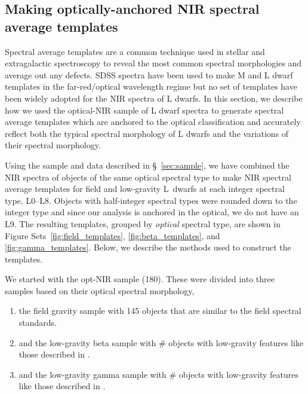 \documentclass[12pt,preprint]{aastex}
\begin{document}
\clearpage
\subsection{Making optically-anchored NIR spectral average templates}
\label{sec:templates}

Spectral average templates are a common technique used in stellar and extragalactic spectroscopy to reveal the most common spectral morphologies and average out any defects.
SDSS spectra have been used to make M and L dwarf templates in the far-red/optical wavelength regime \citep{Bochanski07_templates, Schmidt:2014jc} but no set of templates have been widely adopted for the NIR spectra of L dwarfs.
In this section, we describe how we used the optical-NIR sample of L dwarf spectra to generate spectral average templates which are anchored to the optical classification and accurately reflect both the typical spectral morphology of L dwarfs and the variations of their spectral morphology.

Using the sample and data described in \S~\ref{sec:sample}, we have combined the NIR spectra of objects of the same optical spectral type to make NIR spectral average templates for field and low-gravity L~dwarfs at each integer spectral type, L0--L8. Objects with half-integer spectral types were rounded down to the integer type and since our analysis is anchored in the optical, we do not have an L9.
The resulting templates, grouped by \emph{optical} spectral type, are shown in Figure Sets~\ref{fig:field_templates}, \ref{fig:beta_templates}, and \ref{fig:gamma_templates}.
Below, we describe the methods used to construct the templates.

We started with the opt-NIR sample (180). 
These were divided into three samples based on their optical spectral morphology, 
\begin{enumerate} \itemsep1pt \parskip0pt 
	\item the field gravity sample with 145 objects that are similar to the \citet{K99} field spectral standards.
	\item and the low-gravity beta sample with \# objects with low-gravity features like those described in \citet{Cruz09_lowg}.
	\item and the low-gravity gamma sample with \# objects with low-gravity features like those described in \citet{Cruz09_lowg}.
\end{enumerate}
\end{document}
